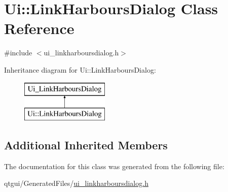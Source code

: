 \hypertarget{class_ui_1_1_link_harbours_dialog}{}\section{Ui\+::Link\+Harbours\+Dialog Class Reference}
\label{class_ui_1_1_link_harbours_dialog}


{\ttfamily \#include $<$ui\+\_\+linkharboursdialog.\+h$>$}

Inheritance diagram for Ui\+::Link\+Harbours\+Dialog\+:\begin{figure}[H]
\begin{center}
\leavevmode
\includegraphics[height=2.000000cm]{d4/ddb/class_ui_1_1_link_harbours_dialog}
\end{center}
\end{figure}
\subsection*{Additional Inherited Members}


The documentation for this class was generated from the following file\+:\begin{DoxyCompactItemize}
\item 
qtgui/\+Generated\+Files/\mbox{\hyperlink{ui__linkharboursdialog_8h}{ui\+\_\+linkharboursdialog.\+h}}\end{DoxyCompactItemize}
